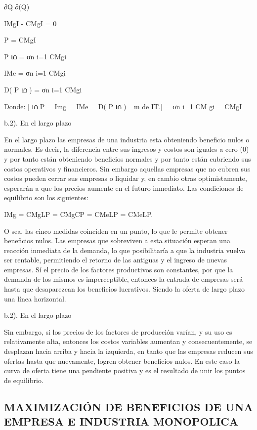 \documentclass[
  letterpaper,
  DIV=11,
  numbers=noendperiod]{scrartcl}
\begin{document}
∂Q ∂(Q)

IMgI - CMgI = 0

P = CMgI

P ഥ = σn i=1 CMgi

IMe = σn i=1 CMgi

D( P ഥ ) = σn i=1 CMgi

Donde: {[} ഥ P = Img = IMe = D( P ഥ ) =m de IT.{]} = σn i=1 CM gi = CMgI

b.2). En el largo plazo

En el largo plazo las empresas de una industria esta obteniendo
beneficio nulos o normales. Es decir, la diferencia entre sus ingresos y
costos son iguales a cero (0) y por tanto están obteniendo beneficios
normales y por tanto están cubriendo sus costos operativos y
financieros. Sin embargo aquellas empresas que no cubren sus costos
pueden cerrar sus empresas o liquidar y, en cambio otras optimistamente,
esperarán a que los precios aumente en el futuro inmediato. Las
condiciones de equilibrio son los siguientes:

IMg = CMgLP = CMgCP = CMeLP = CMeLP.

O sea, las cinco medidas coinciden en un punto, lo que le permite
obtener beneficios nulos. Las empresas que sobreviven a esta situación
esperan una reacción inmediata de la demanda, lo que posibilitaría a que
la industria vuelva ser rentable, permitiendo el retorno de las antiguas
y el ingreso de nuevas empresas. Sí el precio de los factores
productivos son constantes, por que la demanda de los mismos es
imperceptible, entonces la entrada de empresas será hasta que
desaparezcan los beneficios lucrativos. Siendo la oferta de largo plazo
una línea horizontal.

b.2). En el largo plazo

Sin embargo, si los precios de los factores de producción varían, y su
uso es relativamente alta, entonces los costos variables aumentan y
consecuentemente, se desplazan hacia arriba y hacia la izquierda, en
tanto que las empresas reducen sus ofertas hasta que nuevamente, logren
obtener beneficios nulos. En este caso la curva de oferta tiene una
pendiente positiva y es el resultado de unir los puntos de equilibrio.

\hypertarget{maximizaciuxf3n-de-beneficios-de-una-empresa-e-industria-monopolica}{%
\subsection{MAXIMIZACIÓN DE BENEFICIOS DE UNA EMPRESA E INDUSTRIA
MONOPOLICA}\label{maximizaciuxf3n-de-beneficios-de-una-empresa-e-industria-monopolica}}
\end{document}
